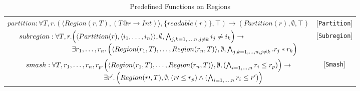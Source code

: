 \documentclass{article}
\newcommand{\rtriple}[3]{\left({#1},{#2},{#3}\right)}
\newcommand{\rsingle}[1]{\rtriple{#1}{\emptyset}{\top}}
\begin{document}
\begin{table*}
\centering
{\small
\begin{tabular}{cc}

%
%
\begin{math}
partition : \forall T,r. \rtriple{\langle Region(r,T), (T@r \rightarrow \mathit{Int}) \rangle}{\{readable(r)\}}{\top} \rightarrow \rsingle{Partition(r)}
\end{math} & [{\tt Partition}] \\

%
%
\begin{math}
\begin{array}{lc}
\begin{array}{l@{}l}
subregion : \forall T,r. & \rtriple{\langle Partition(r), \langle i_1, \ldots, i_n \rangle \rangle}{\emptyset}{\bigwedge_{j,k = 1, \ldots, n, j \ne k} i_j \ne i_k}
\rightarrow \\
& \exists r_1, \ldots, r_n. \rtriple{\langle Region(r_1,T), \ldots, Region(r_n,T) \rangle}{\emptyset}{\bigwedge_{j,k = 1, \ldots, n, j \ne k}. r_j * r_k}
\end{array}
\end{array}
\end{math} & [{\tt Subregion}] \\

%
%
\begin{math}
\begin{array}{l@{}l}
smash : \forall T,r_1,\ldots,r_n,r_p. & \rtriple{\langle Region(r_1,T), \ldots, Region(r_n,T) \rangle}{\emptyset}{(\bigwedge_{i = 1, \ldots, n} r_i \le r_p)} \rightarrow \\
& \exists r'.  \rtriple{Region(r\prime,T)}{\emptyset}{(r\prime \le r_p) \wedge (\bigwedge_{i = 1, \ldots, n} r_i \le r')}
\end{array}
\end{math} & [{\tt Smash}] \\

\end{tabular}
}
\caption{Predefined Functions on Regions}
\end{table*}
\end{document}
